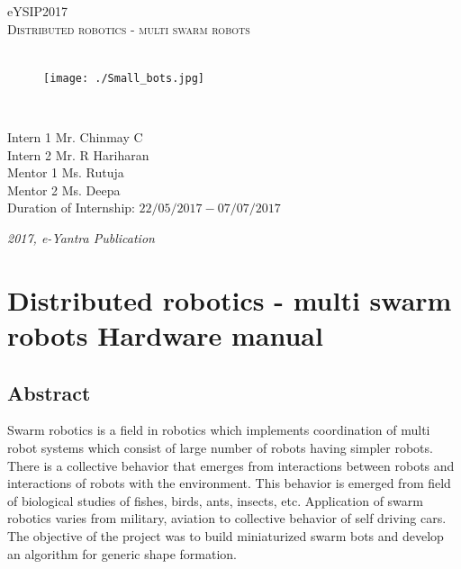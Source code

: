 \documentclass[a4paper,12pt,oneside]{book}
\begin{document}
\begin{titlepage}
\raggedright
{\Large eYSIP2017\\[1cm]}
{\Huge\scshape\centering Distributed robotics - multi swarm robots \\[.1in]}
\vfill
\hfill\\
\begin{figure}[h!]
	\centering\texttt{[image: ./Small\_bots.jpg]}		
\end{figure}	
\hfill\\
\begin{flushright}
{\large Intern 1 Mr. Chinmay C \\}
{\large Intern 2 Mr. R Hariharan \\}
{\large Mentor 1 Ms. Rutuja \\}
{\large Mentor 2 Ms. Deepa \\}
{\large Duration of Internship: $ 22/05/2017-07/07/2017 $ \\}
\end{flushright}

{\itshape 2017, e-Yantra Publication}
\end{titlepage}

\tableofcontents

\chapter[Distributed robotics - multi swarm robots Hardware manual]{Distributed robotics - multi swarm robots Hardware manual}
\section{Abstract}
Swarm robotics is a field in robotics which implements coordination of multi robot systems which consist of large number of robots having simpler robots. There is a collective behavior that emerges from interactions between robots and interactions of robots with the environment. This behavior is emerged from field of biological studies of fishes, birds, ants, insects, etc. Application of swarm robotics varies from military, aviation to collective behavior of self driving cars. The objective of the project was to build miniaturized swarm bots and develop an algorithm for generic shape formation.
\end{document}
